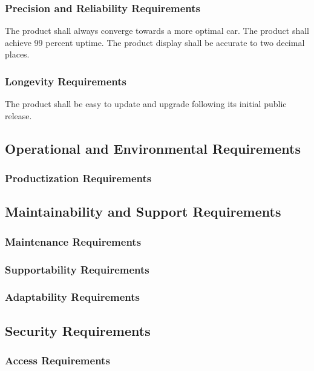 \documentclass[12pt, titlepage]{article}
\begin{document}
\subsubsection{Precision and Reliability Requirements}

The product shall always converge towards a more optimal car. The product shall achieve 99 percent uptime. The product display shall be accurate to two decimal places.

\subsubsection{Longevity Requirements}

The product shall be easy to update and upgrade following its initial public release. 

\subsection{Operational and Environmental Requirements}

\subsubsection{Productization Requirements}

\subsection{Maintainability and Support Requirements}

\subsubsection{Maintenance Requirements}

\subsubsection{Supportability Requirements}

\subsubsection{Adaptability Requirements}

\subsection{Security Requirements}

\subsubsection{Access Requirements}
\end{document}
